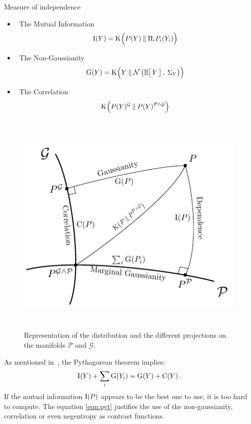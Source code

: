 \documentclass{beamer}
\newcommand{\Kl}[3][]{\mathrm K_{#1}\!\zp{#2\:\|\:#3}}
\newcommand{\zZ}[2]{\mathrm #1\!\zp{#2}}
\newcommand{\zD}{\mathcal}
\newcommand{\Ng}[2]{\mathcal{N}\zp{#1,\:#2}}
\begin{document}
\begin{frame}{}
\begin{columns}[T]
\begin{column}{.48\linewidth}
\begin{block}{Measure of independence}
{\begin{minipage}{.46\textwidth}
\begin{itemize}
\item \ The Mutual Information
\begin{equation}
\zZ IY = \Kl {\zpbig2 P(Y)}{\Pi_i P_i(Y_i)}  
\end{equation}

\item \ The Non-Gaussianity
\begin{equation}
  \zZ GY = \Kl{Y}{\Ng{\zesp Y}{\Sigma_Y}\zpbig2}
\end{equation}

\item \ The Correlation
\begin{equation}
  \Kl{\zpbig2 P(Y)^{\zD G}}{P(Y)^{\zD P\wedge\zD G}}
\end{equation}
\end{itemize}

\end{minipage}
\hss
\begin{minipage}{.5\textwidth}
\begin{figure}
\label{fig:sketch}
\centering
  \includegraphics[height = 11cm, width=\textwidth]{../figure_tikz/theory_info}
  \caption{Representation of the distribution and the different projections on the manifolds $\zD P$ and $\zD G$.}
\end{figure}
\end{minipage}
}

As mentioned in~\cite{}, the Pythagorean theorem implies:
\begin{equation}
\label{eqn:pyt}
        \zZ IY + \sum_i\zZ G{Y_i} = \zZ GY + \zZ CY.
\end{equation}
If the mutual information $\zZ I P$ appears to be the best one to use, it is too hard to compute.
The equation \ref{eqn:pyt} justifies the use of the non-gaussianity, correlation or even negentropy as contrast functions.


\end{block}
\end{column}
\end{columns}
\end{frame}
\end{document}
